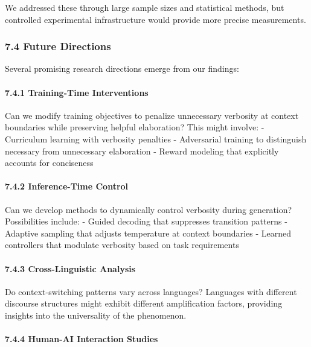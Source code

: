 \documentclass[
  11pt]{article}
\begin{document}
We addressed these through large sample sizes and statistical methods,
but controlled experimental infrastructure would provide more precise
measurements.

\subsubsection{7.4 Future Directions}\label{future-directions}

Several promising research directions emerge from our findings:

\paragraph{7.4.1 Training-Time
Interventions}\label{training-time-interventions}

Can we modify training objectives to penalize unnecessary verbosity at
context boundaries while preserving helpful elaboration? This might
involve: - Curriculum learning with verbosity penalties - Adversarial
training to distinguish necessary from unnecessary elaboration - Reward
modeling that explicitly accounts for conciseness

\paragraph{7.4.2 Inference-Time Control}\label{inference-time-control}

Can we develop methods to dynamically control verbosity during
generation? Possibilities include: - Guided decoding that suppresses
transition patterns - Adaptive sampling that adjusts temperature at
context boundaries - Learned controllers that modulate verbosity based
on task requirements

\paragraph{7.4.3 Cross-Linguistic
Analysis}\label{cross-linguistic-analysis}

Do context-switching patterns vary across languages? Languages with
different discourse structures might exhibit different amplification
factors, providing insights into the universality of the phenomenon.

\paragraph{7.4.4 Human-AI Interaction
Studies}\label{human-ai-interaction-studies}
\end{document}
